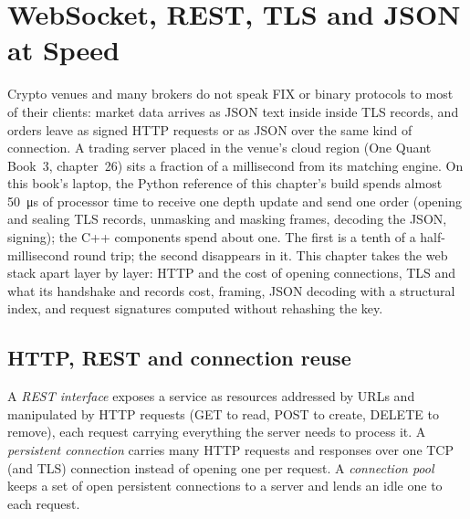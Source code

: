 \chapter{WebSocket, REST, TLS and JSON at Speed}\label{ch:ll:websocket-rest-tls-and-json-at-speed}

Crypto venues and many brokers do not speak FIX or binary protocols to most of their clients: market data arrives as JSON
text inside  inside TLS records, and orders leave as signed HTTP requests or as JSON over the same kind of
connection. A trading server placed in the venue's cloud region (One Quant Book~3, chapter~26) sits a fraction of a
millisecond from its matching engine. On this book's laptop, the Python reference of this chapter's build spends almost
\qty{50}{\micro\second} of processor time to receive one depth update and send one order (opening and sealing TLS records,
unmasking and masking frames, decoding the JSON, signing); the C++ components spend about one. The first is a tenth of a
half-millisecond round trip; the second disappears in it. This chapter takes the web stack apart layer by layer: HTTP and
the cost of opening connections, TLS and what its handshake and records cost,  framing, JSON decoding with a
structural index, and request signatures computed without rehashing the key.

\section{HTTP, REST and connection reuse}

\begin{definition}\label{def:ll:websocket-rest-tls-and-json-at-speed:rest}
A \emph{REST interface} exposes a service as resources addressed by URLs and manipulated by HTTP
requests (GET to read, POST to create, DELETE to remove), each request carrying everything the server needs to process it. A
\emph{persistent connection} carries many HTTP requests and responses over one TCP (and TLS)
connection instead of opening one per request. A \emph{connection pool} keeps a set of open persistent
connections to a server and lends an idle one to each request.
\end{definition}

